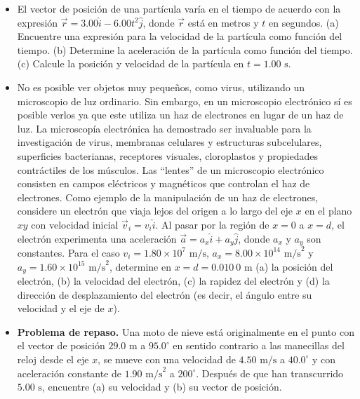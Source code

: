 \documentclass[11pt,a4paper]{article}
\begin{document}
\begin{itemize}
    \item[\textbf{3.}] El vector de posición de una partícula varía en el tiempo de acuerdo con la expresión $\vec{r} = 3.00\hat{i} - 6.00t^2\hat{j}$, donde $\vec{r}$ está en metros y $t$ en segundos. (a) Encuentre una expresión para la velocidad de la partícula como función del tiempo. (b) Determine la aceleración de la partícula como función del tiempo. (c) Calcule la posición y velocidad de la partícula en $t = 1.00 \text{ s}$.
    \vspace*{6cm}

    \item[\textbf{4.}] No es posible ver objetos muy pequeños, como virus, utilizando un microscopio de luz ordinario. Sin embargo, en un microscopio electrónico sí es posible verlos ya que este utiliza un haz de electrones en lugar de un haz de luz. La microscopía electrónica ha demostrado ser invaluable para la investigación de virus, membranas celulares y estructuras subcelulares, superficies bacterianas, receptores visuales, cloroplastos y propiedades contráctiles de los músculos. Las ``lentes'' de un microscopio electrónico consisten en campos eléctricos y magnéticos que controlan el haz de electrones. Como ejemplo de la manipulación de un haz de electrones, considere un electrón que viaja lejos del origen a lo largo del eje $x$ en el plano $xy$ con velocidad inicial $\vec{v}_i = v_i\hat{i}$. Al pasar por la región de $x = 0$ a $x = d$, el electrón experimenta una aceleración $\vec{a} = a_x\hat{i} + a_y\hat{j}$, donde $a_x$ y $a_y$ son constantes. Para el caso $v_i = 1.80 \times 10^7 \text{ m/s}$, $a_x = 8.00 \times 10^{14} \text{ m/s}^2$ y $a_y = 1.60 \times 10^{15} \text{ m/s}^2$, determine en $x = d = 0.010\ 0 \text{ m}$ (a) la posición del electrón, (b) la velocidad del electrón, (c) la rapidez del electrón y (d) la dirección de desplazamiento del electrón (es decir, el ángulo entre su velocidad y el eje de $x$).
    \vspace*{8cm}

    \item[\textbf{5.}] \textbf{Problema de repaso.} Una moto de nieve está originalmente en el punto con el vector de posición $29.0 \text{ m}$ a $95.0^\circ$ en sentido contrario a las manecillas del reloj desde el eje $x$, se mueve con una velocidad de $4.50 \text{ m/s}$ a $40.0^\circ$ y con aceleración constante de $1.90 \text{ m/s}^2$ a $200^\circ$. Después de que han transcurrido $5.00 \text{ s}$, encuentre (a) su velocidad y (b) su vector de posición.
    \vspace*{6cm}
\end{itemize}
\end{document}
